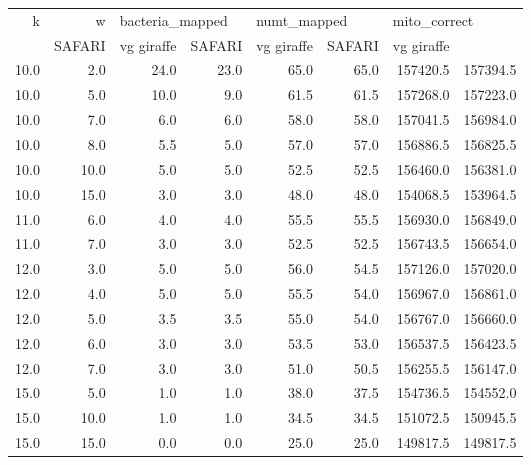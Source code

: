 \begin{tabular}{rrrrrrrr}
\toprule
   k &    w & \multicolumn{2}{l}{bacteria\_mapped} & \multicolumn{2}{l}{numt\_mapped} & \multicolumn{2}{l}{mito\_correct} \\
     &          SAFARI & vg giraffe &      SAFARI & vg giraffe &       SAFARI & vg giraffe \\
\midrule
10.0 &  2.0 &            24.0 &       23.0 &        65.0 &       65.0 &     157420.5 &   157394.5 \\
10.0 &  5.0 &            10.0 &        9.0 &        61.5 &       61.5 &     157268.0 &   157223.0 \\
10.0 &  7.0 &             6.0 &        6.0 &        58.0 &       58.0 &     157041.5 &   156984.0 \\
10.0 &  8.0 &             5.5 &        5.0 &        57.0 &       57.0 &     156886.5 &   156825.5 \\
10.0 & 10.0 &             5.0 &        5.0 &        52.5 &       52.5 &     156460.0 &   156381.0 \\
10.0 & 15.0 &             3.0 &        3.0 &        48.0 &       48.0 &     154068.5 &   153964.5 \\
11.0 &  6.0 &             4.0 &        4.0 &        55.5 &       55.5 &     156930.0 &   156849.0 \\
11.0 &  7.0 &             3.0 &        3.0 &        52.5 &       52.5 &     156743.5 &   156654.0 \\
12.0 &  3.0 &             5.0 &        5.0 &        56.0 &       54.5 &     157126.0 &   157020.0 \\
12.0 &  4.0 &             5.0 &        5.0 &        55.5 &       54.0 &     156967.0 &   156861.0 \\
12.0 &  5.0 &             3.5 &        3.5 &        55.0 &       54.0 &     156767.0 &   156660.0 \\
12.0 &  6.0 &             3.0 &        3.0 &        53.5 &       53.0 &     156537.5 &   156423.5 \\
12.0 &  7.0 &             3.0 &        3.0 &        51.0 &       50.5 &     156255.5 &   156147.0 \\
15.0 &  5.0 &             1.0 &        1.0 &        38.0 &       37.5 &     154736.5 &   154552.0 \\
15.0 & 10.0 &             1.0 &        1.0 &        34.5 &       34.5 &     151072.5 &   150945.5 \\
15.0 & 15.0 &             0.0 &        0.0 &        25.0 &       25.0 &     149817.5 &   149817.5 \\

\end{tabular}
